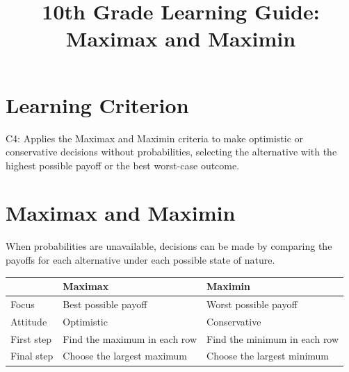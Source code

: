 \makeatletter
{}
\makeatother



\title{10th Grade Learning Guide: Maximax and Maximin}
\author{}
\date{}

\pagestyle{empty}


	
	\maketitle
	\vspace*{-2.5cm}
	
	
	\section*{Learning Criterion}
	
	C4: Applies the Maximax and Maximin criteria to make optimistic or
	conservative decisions without probabilities, selecting the alternative
	with the highest possible payoff or the best worst-case outcome.
	
	
	\section{Maximax and Maximin}
	
	When probabilities are unavailable, decisions can be made by comparing
	the payoffs for each alternative under each possible state of nature.
	
	\begin{center}
		\renewcommand{\arraystretch}{1.4}
		\begin{tabular}{p{}p{}p{}}
			\toprule
			& \textbf{Maximax} & \textbf{Maximin} \\
			\midrule
			Focus & Best possible payoff & Worst possible payoff \\
			Attitude & Optimistic & Conservative \\
			First step & Find the maximum in each row & Find the minimum in each row \\
			Final step & Choose the largest maximum & Choose the largest minimum \\
			\bottomrule
		\end{tabular}
	\end{center}
	
